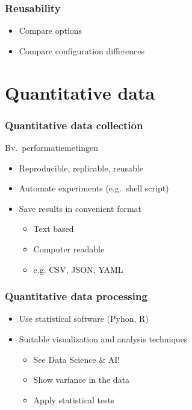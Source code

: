 \documentclass[aspectratio=169]{beamer}
\begin{document}
\begin{frame}
  \frametitle{Reusability}


  \bigskip

  \begin{itemize}
    \item Compare options
    \item Compare configuration differences
  \end{itemize}

\end{frame}

\section{Quantitative data}

\begin{frame}
  \frametitle{Quantitative data collection}

  Bv.\ performatiemetingen

  \begin{itemize}
    \item Reproducible, replicable, reusable
    \item Automate experiments (e.g.\ shell script)
    \item Save results in convenient format
    \begin{itemize}
        \item Text based
        \item Computer readable
        \item e.g. CSV, JSON, YAML
    \end{itemize}
  \end{itemize}

\end{frame}

\begin{frame}
  \frametitle{Quantitative data processing}

  \begin{itemize}
    \item Use statistical software (Pyhon, R)
    \item Suitable visualization and analysis techniques
    \begin{itemize}
        \item See Data Science \& AI!
        \item Show variance in the data
        \item Apply statistical tests
    \end{itemize}
  \end{itemize}

\end{frame}
  
\end{document}
